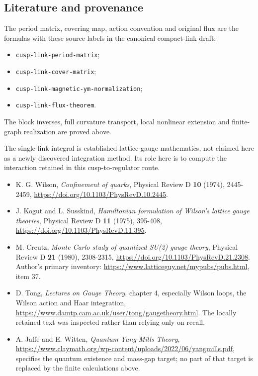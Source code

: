 \documentclass[
  11pt,
]{article}
\providecommand{\tightlist}{%
  \setlength{\itemsep}{0pt}\setlength{\parskip}{0pt}}
\begin{document}
\subsection{Literature and provenance}\label{literature-and-provenance}

The period matrix, covering map, action convention and original flux are
the formulas with these source labels in the canonical compact-link
draft:

\begin{itemize}
\tightlist
\item
  \texttt{cusp-link-period-matrix};
\item
  \texttt{cusp-link-cover-matrix};
\item
  \texttt{cusp-link-magnetic-ym-normalization};
\item
  \texttt{cusp-link-flux-theorem}.
\end{itemize}

The block inverses, full curvature transport, local nonlinear extension
and finite-graph realization are proved above.

The single-link integral is established lattice-gauge mathematics, not
claimed here as a newly discovered integration method. Its role here is
to compute the interaction retained in this cusp-to-regulator route.

\begin{itemize}
\tightlist
\item
  K. G. Wilson, \emph{Confinement of quarks}, Physical Review D
  \textbf{10} (1974), 2445-2459,
  \url{https://doi.org/10.1103/PhysRevD.10.2445}.
\item
  J. Kogut and L. Susskind, \emph{Hamiltonian formulation of Wilson's
  lattice gauge theories}, Physical Review D \textbf{11} (1975),
  395-408, \url{https://doi.org/10.1103/PhysRevD.11.395}.
\item
  M. Creutz, \emph{Monte Carlo study of quantized SU(2) gauge theory},
  Physical Review D \textbf{21} (1980), 2308-2315,
  \url{https://doi.org/10.1103/PhysRevD.21.2308}. Author's primary
  inventory: \url{https://www.latticeguy.net/mypubs/pubs.html}, item 37.
\item
  D. Tong, \emph{Lectures on Gauge Theory}, chapter 4, especially Wilson
  loops, the Wilson action and Haar integration,
  \url{https://www.damtp.cam.ac.uk/user/tong/gaugetheory.html}. The
  locally retained text was inspected rather than relying only on
  recall.
\item
  A. Jaffe and E. Witten, \emph{Quantum Yang-Mills Theory},
  \url{https://www.claymath.org/wp-content/uploads/2022/06/yangmills.pdf},
  specifies the quantum existence and mass-gap target; no part of that
  target is replaced by the finite calculations above.
\end{itemize}
\end{document}
